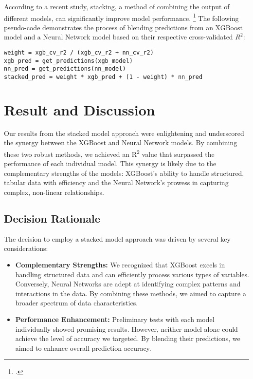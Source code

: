 \documentclass{article}
\begin{document}
According to a recent study, stacking, a method of combining the output of different models, can significantly improve model performance. \footcite{soni2023stacking} The following pseudo-code demonstrates the process of blending predictions from an XGBoost model and a Neural Network model based on their respective cross-validated $R^2$:

\begin{verbatim}
weight = xgb_cv_r2 / (xgb_cv_r2 + nn_cv_r2)
xgb_pred = get_predictions(xgb_model)
nn_pred = get_predictions(nn_model)
stacked_pred = weight * xgb_pred + (1 - weight) * nn_pred
\end{verbatim}

\section{Result and Discussion}

Our results from the stacked model approach were enlightening and underscored the synergy between the XGBoost and Neural Network models. By combining these two robust methods, we achieved an R\textsuperscript{2} value that surpassed the performance of each individual model. This synergy is likely due to the complementary strengths of the models: XGBoost's ability to handle structured, tabular data with efficiency and the Neural Network's prowess in capturing complex, non-linear relationships.

\subsection{Decision Rationale}

The decision to employ a stacked model approach was driven by several key considerations:

\begin{itemize}
    \item \textbf{Complementary Strengths:} We recognized that XGBoost excels in handling structured data and can efficiently process various types of variables. Conversely, Neural Networks are adept at identifying complex patterns and interactions in the data. By combining these methods, we aimed to capture a broader spectrum of data characteristics.
    \item \textbf{Performance Enhancement:} Preliminary tests with each model individually showed promising results. However, neither model alone could achieve the level of accuracy we targeted. By blending their predictions, we aimed to enhance overall prediction accuracy.
\end{itemize}
\end{document}
